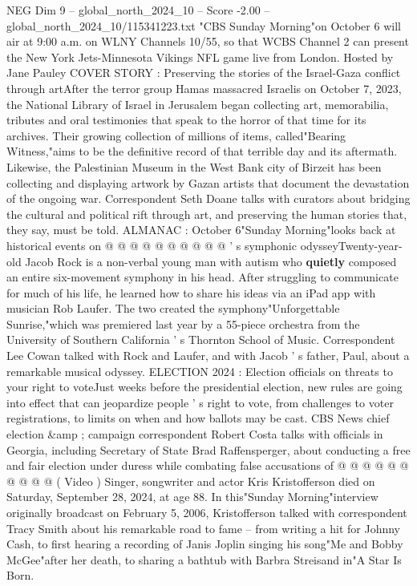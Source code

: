 \begin{textsample}{NEG Dim 9 – global\_north\_2024\_10 – Score -2.00 – global\_north\_2024\_10/115341223.txt}  \label{ex:f9_neg_234}
"CBS Sunday Morning"on October 6 will air at 9:00 a.m. on WLNY Channels 10/55, so that WCBS Channel 2 can present the New York Jets-Minnesota Vikings NFL game live from London.
Hosted by Jane Pauley COVER STORY : Preserving the stories of the Israel-Gaza conflict through artAfter the terror group Hamas massacred Israelis on October 7, 2023, the National Library of Israel in Jerusalem began collecting art, memorabilia, tributes and oral testimonies that speak to the horror of that time for its archives.
Their growing collection of millions of items, called"Bearing Witness,"aims to be the definitive record of that terrible day and its aftermath.
Likewise, the Palestinian Museum in the West Bank city of Birzeit has been collecting and displaying artwork by Gazan artists that document the devastation of the ongoing war.
Correspondent Seth Doane talks with curators about bridging the cultural and political rift through art, and preserving the human stories that, they say, must be told.
ALMANAC : October 6"Sunday Morning"looks back at historical events on @ @ @ @ @ @ @ @ @ @ ' s symphonic odysseyTwenty-year-old Jacob Rock is a non-verbal young man with autism who \textbf{quietly} composed an entire six-movement symphony in his head.
After struggling to communicate for much of his life, he learned how to share his ideas via an iPad app with musician Rob Laufer.
The two created the symphony"Unforgettable Sunrise,"which was premiered last year by a 55-piece orchestra from the University of Southern California ' s Thornton School of Music.
Correspondent Lee Cowan talked with Rock and Laufer, and with Jacob ' s father, Paul, about a remarkable musical odyssey.
ELECTION 2024 : Election officials on threats to your right to voteJust weeks before the presidential election, new rules are going into effect that can jeopardize people ' s right to vote, from challenges to voter registrations, to limits on when and how ballots may be cast.
CBS News chief election \&amp ; campaign correspondent Robert Costa talks with officials in Georgia, including Secretary of State Brad Raffensperger, about conducting a free and fair election under duress while combating false accusations of @ @ @ @ @ @ @ @ @ @ ( Video ) Singer, songwriter and actor Kris Kristofferson died on Saturday, September 28, 2024, at age 88.
In this"Sunday Morning"interview originally broadcast on February 5, 2006, Kristofferson talked with correspondent Tracy Smith about his remarkable road to fame -- from writing a hit for Johnny Cash, to first hearing a recording of Janis Joplin singing his song"Me and Bobby McGee"after her death, to sharing a bathtub with Barbra Streisand in"A Star Is Born.

\end{textsample}

